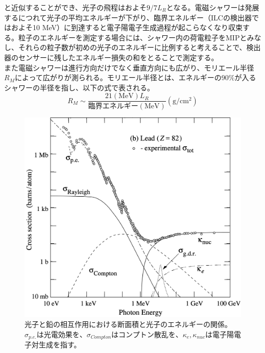  と近似することができ、光子の飛程はおよそ$9/7L_R$となる。電磁シャワーは発展するにつれて光子の平均エネルギーが下がり、臨界エネルギー（ILCの検出器ではおよそ10 MeV）に到達すると電子陽電子生成過程が起こらなくなり収束する。粒子のエネルギーを測定する場合には、シャワー内の荷電粒子をMIPとみなし、それらの粒子数が初めの光子のエネルギーに比例すると考えることで、検出器のセンサーに残したエネルギー損失の和をとることで測定する。\\
 また電磁シャワーは進行方向だけでなく垂直方向にも広がり、モリエール半径$R_M$によって広がりが測られる。モリエール半径とは、エネルギーの90$\%$が入るシャワーの半径を指し、以下の式で表される。
\begin{equation}
 \label{moliere}
 R_M \sim \frac{21 (\mathrm{MeV}) L_R}{臨界エネルギー (\mathrm{MeV})}  (\mathrm{g}/\mathrm{{cm}^2})
\end{equation}
\begin{figure}[h]
	\begin{center}
 \includegraphics[keepaspectratio, scale=0.4]
 	{Figure/Siwecal/photon_crosssection.png}
 		\caption{光子と鉛の相互作用における断面積と光子のエネルギーの関係。${\sigma}_{p.e.}$は光電効果を、${\sigma}_{Compton}$はコンプトン散乱を、${\kappa}_{e}, {\kappa}_{nuc}$は電子陽電子対生成を指す。}
 		\label{photon_cs}
	\end{center}
 \end{figure}
